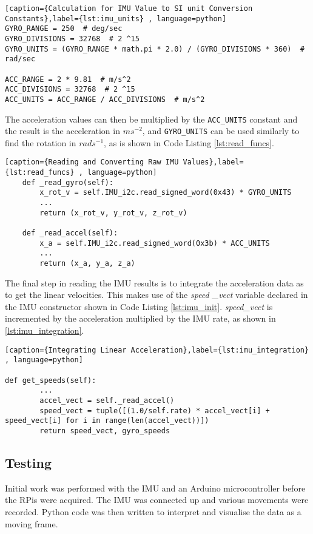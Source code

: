 \begin{lstlisting}[caption={Calculation for IMU Value to SI unit Conversion Constants},label={lst:imu_units} , language=python]
GYRO_RANGE = 250  # deg/sec
GYRO_DIVISIONS = 32768  # 2 ^15
GYRO_UNITS = (GYRO_RANGE * math.pi * 2.0) / (GYRO_DIVISIONS * 360)  # rad/sec

ACC_RANGE = 2 * 9.81  # m/s^2
ACC_DIVISIONS = 32768  # 2 ^15
ACC_UNITS = ACC_RANGE / ACC_DIVISIONS  # m/s^2
\end{lstlisting}

The acceleration values can then be multiplied by the \verb|ACC_UNITS|
constant and the result is the acceleration in $ms^{-2}$, and \verb|GYRO_UNITS|
can be used similarly to find the rotation in $rads^{-1}$, as is
shown in Code Listing \ref{lst:read_funcs}.


\begin{lstlisting}[caption={Reading and Converting Raw IMU Values},label={lst:read_funcs} , language=python]
    def _read_gyro(self):
        x_rot_v = self.IMU_i2c.read_signed_word(0x43) * GYRO_UNITS
		...
        return (x_rot_v, y_rot_v, z_rot_v)

    def _read_accel(self):
        x_a = self.IMU_i2c.read_signed_word(0x3b) * ACC_UNITS
		...
        return (x_a, y_a, z_a)
\end{lstlisting}

The final step in reading the IMU results is to integrate the acceleration
data as to get the linear velocities. This makes use of the \textit{speed
\_vect} variable declared in the IMU constructor shown in Code Listing
\ref{lst:imu_init}. \textit{speed\_vect} is incremented by the
acceleration multiplied by the IMU rate, as shown in
\ref{lst:imu_integration}.

\begin{lstlisting}[caption={Integrating Linear Acceleration},label={lst:imu_integration} , language=python]

def get_speeds(self):
		...
        accel_vect = self._read_accel()
        speed_vect = tuple([(1.0/self.rate) * accel_vect[i] + speed_vect[i] for i in range(len(accel_vect))])
        return speed_vect, gyro_speeds
\end{lstlisting}


\subsection{Testing}\label{elec/imu/test}
Initial work was performed with the IMU and an Arduino microcontroller before the RPis were acquired. The IMU was connected up and various movements were recorded. Python code was then written to interpret and visualise the data as a moving frame.

